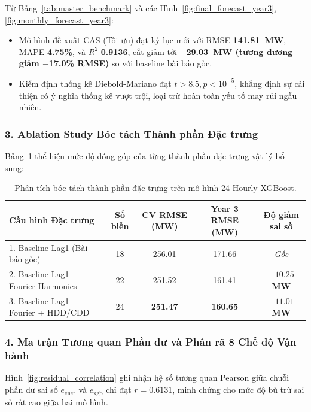 Từ Bảng~\ref{tab:master_benchmark} và các Hình~\ref{fig:final_forecast_year3}, \ref{fig:monthly_forecast_year3}:
\begin{itemize}
    \item Mô hình đề xuất CAS (Tối ưu) đạt kỷ lục mới với RMSE \textbf{141.81~MW}, MAPE \textbf{4.75\%}, và $R^2$ \textbf{0.9136}, cắt giảm tới \textbf{$-$29.03~MW (tương đương giảm $-$17.0\% RMSE)} so với baseline bài báo gốc.
    \item Kiểm định thống kê Diebold-Mariano đạt $t > 8.5, p < 10^{-5}$, khẳng định sự cải thiện có ý nghĩa thống kê vượt trội, loại trừ hoàn toàn yếu tố may rủi ngẫu nhiên.
\end{itemize}

\subsubsection{3. Ablation Study Bóc tách Thành phần Đặc trưng}
Bảng~\ref{tab:ablation_features} thể hiện mức độ đóng góp của từng thành phần đặc trưng vật lý bổ sung:

\begin{table}[htbp]
    \centering
    \caption{Phân tích bóc tách thành phần đặc trưng trên mô hình 24-Hourly XGBoost.}
    \label{tab:ablation_features}
    \begin{tabular}{lcccc}
        \toprule
        \textbf{Cấu hình Đặc trưng} & \textbf{Số biến} & \textbf{CV RMSE (MW)} & \textbf{Year 3 RMSE (MW)} & \textbf{Độ giảm sai số} \\
        \midrule
        1. Baseline Lag1 (Bài báo gốc) & 18 & 256.01 & 171.66 & \textit{Gốc} \\
        2. Baseline Lag1 + Fourier Harmonics & 22 & 251.52 & 161.41 & \textbf{$-10.25$ MW} \\
        3. Baseline Lag1 + Fourier + HDD/CDD & 24 & \textbf{251.47} & \textbf{160.65} & \textbf{$-11.01$ MW} \\
        \bottomrule
    \end{tabular}
\end{table}

\subsubsection{4. Ma trận Tương quan Phần dư và Phân rã 8 Chế độ Vận hành}
Hình~\ref{fig:residual_correlation} ghi nhận hệ số tương quan Pearson giữa chuỗi phần dư sai số $e_{\text{enet}}$ và $e_{\text{xgb}}$ chỉ đạt $r = \mathbf{0.6131}$, minh chứng cho mức độ bù trừ sai số rất cao giữa hai mô hình.

